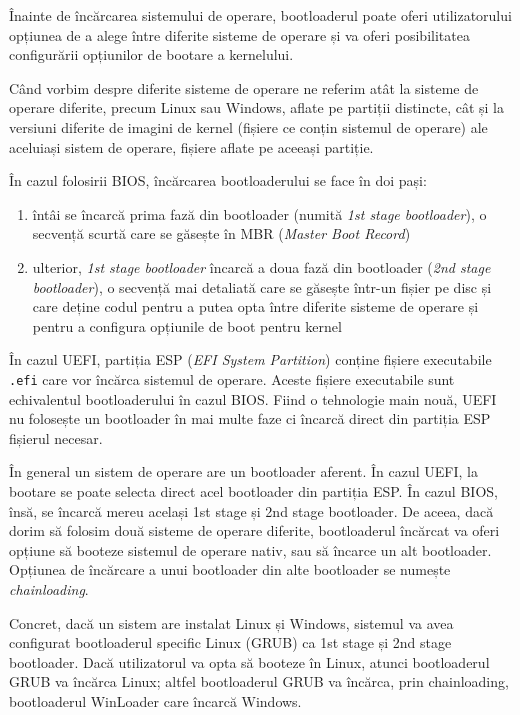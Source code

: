 Înainte de încărcarea sistemului de operare, bootloaderul poate oferi
utilizatorului opțiunea de a alege între diferite sisteme de operare și va oferi
posibilitatea configurării opțiunilor de bootare a kernelului.

Când vorbim despre diferite sisteme de operare ne referim atât la sisteme de operare
diferite, precum Linux sau Windows, aflate pe partiții distincte, cât și la
versiuni diferite de imagini de kernel (fișiere ce conțin sistemul de operare)
ale aceluiași sistem de operare, fișiere aflate pe aceeași partiție.

În cazul folosirii BIOS, încărcarea bootloaderului se face în doi pași:

\begin{enumerate}
  \item întâi se încarcă prima fază din bootloader (numită \textit{1st stage bootloader}), o secvență scurtă care se găsește în MBR (\textit{Master
    Boot Record})
  \item ulterior, \textit{1st stage bootloader} încarcă a doua fază din bootloader
    (\textit{2nd stage bootloader}), o secvență mai detaliată care se găsește
		într-un fișier pe disc și care deține codul pentru a putea opta
		între diferite sisteme de operare și pentru a configura
		opțiunile de boot pentru kernel
\end{enumerate}

În cazul UEFI, partiția ESP (\textit{EFI System Partition}) conține fișiere executabile
\texttt{.efi} care vor încărca sistemul de operare. Aceste fișiere executabile sunt
echivalentul bootloaderului în cazul BIOS. Fiind o tehnologie main nouă, UEFI
nu folosește un bootloader în mai multe faze ci încarcă direct din partiția ESP
fișierul necesar.

În general un sistem de operare are un bootloader aferent. În cazul UEFI, la
bootare se poate selecta direct acel bootloader din partiția ESP. În cazul BIOS,
însă, se încarcă mereu același 1st stage și 2nd stage bootloader. De aceea, dacă
dorim să folosim două sisteme de operare diferite, bootloaderul încărcat va
oferi opțiune să booteze sistemul de operare nativ, sau să încarce un alt
bootloader. Opțiunea de încărcare a unui bootloader din alte bootloader se
numește \textit{chainloading}.

Concret, dacă un sistem are instalat Linux și Windows, sistemul va avea configurat
bootloaderul specific Linux (GRUB) ca 1st stage și 2nd stage bootloader. Dacă
utilizatorul va opta să booteze în Linux, atunci bootloaderul GRUB va încărca
Linux; altfel bootloaderul GRUB va încărca, prin chainloading, bootloaderul
WinLoader care încarcă Windows.

